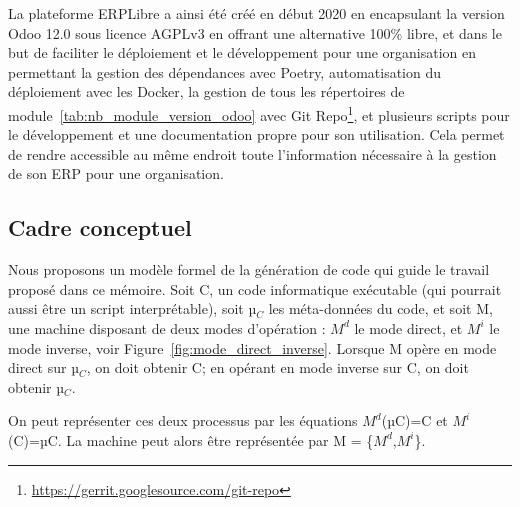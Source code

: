 La plateforme ERPLibre a ainsi été créé en début 2020 en encapsulant la version Odoo 12.0 sous licence AGPLv3 en offrant une alternative 100\% libre, et dans le but de faciliter le déploiement et le développement pour une organisation en permettant la gestion des dépendances avec Poetry, automatisation du déploiement avec les Docker, la gestion de tous les répertoires de module~\ref{tab:nb_module_version_odoo} avec Git Repo\footnote{\url{https://gerrit.googlesource.com/git-repo}}, et plusieurs scripts pour le développement et une documentation propre pour son utilisation. Cela permet de rendre accessible au même endroit toute l'information nécessaire à la gestion de son ERP pour une organisation.





\subsection{Cadre conceptuel} \label{subsection_cadre_conceptuel}

Nous proposons un modèle formel de la génération de code qui guide le travail proposé dans ce mémoire. Soit C, un code informatique exécutable (qui pourrait aussi être un script interprétable), soit µ$_C$ les méta-données du code, et soit M, une machine disposant de deux modes d’opération : $M^d$ le mode direct, et $M^i$ le mode inverse, voir Figure~\ref{fig:mode_direct_inverse}. Lorsque M opère en mode direct sur µ$_C$, on doit obtenir C; en opérant en mode inverse sur C, on doit obtenir µ$_C$.

On peut représenter ces deux processus par les équations $M^d$(µC)=C et $M^i$(C)=µC. La machine peut alors être représentée par M = \{$M^d$,$M^i$\}.

